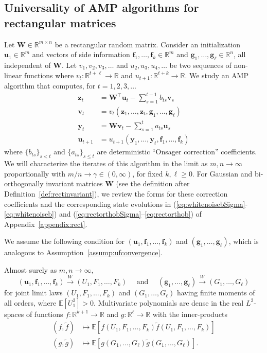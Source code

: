 \documentclass[10pt,reqno]{amsart}
\def\u{\mathbf{u}}
\def\v{\mathbf{v}}
\def\y{\mathbf{y}}
\def\z{\mathbf{z}}
\def\f{\mathbf{f}}
\def\g{\mathbf{g}}
\def\W{\mathbf{W}}
\def\E{\mathbb{E}}
\def\R{\mathbb{R}}
\def\toW{\overset{W}{\to}}
\def\bW{{\mathbf{W}}}
\begin{document}
\subsection{Universality of AMP algorithms for rectangular matrices}\label{sec:result_rec}

Let $\W \in \R^{m \times n}$ be a rectangular random matrix. Consider an
initialization $\u_1 \in \R^m$ and vectors of
side information $\f_1,\ldots,\f_k \in \R^m$ and $\g_1,\ldots,\g_\ell \in \R^n$,
all independent of $\W$. Let $v_1,v_2,v_3,\ldots$ and $u_2,u_3,u_4,\ldots$ be two sequences
of non-linear functions where $v_t:\R^{t+\ell} \to \R$ and
$u_{t+1}:\R^{t+k} \to \R$. We study an AMP algorithm that
computes, for $t=1,2,3,\ldots$
\begin{subequations}\label{eq:AMPrect}
\begin{align}
\z_t&=\W^\top \u_t-\sum_{s=1}^{t-1} b_{ts}\v_s \label{eq:AMPrectz}\\
\v_t&=v_t(\z_1,\ldots,\z_t,\g_1,\ldots,\g_\ell)\\
\y_t&=\W\v_t-\sum_{s=1}^t a_{ts} \u_s\\
\u_{t+1}&=u_{t+1}(\y_1,\ldots,\y_t,\f_1,\ldots,\f_k)\label{eq:AMPrectu}
\end{align}
\end{subequations}
where $\{b_{ts}\}_{s<t}$ and $\{a_{ts}\}_{s \leq t}$ are deterministic ``Onsager
correction'' coefficients. We will characterize the iterates of this algorithm
in the limit as $m,n \to \infty$ proportionally with
$m/n \to \gamma \in (0,\infty)$, for fixed $k,\ell \geq 0$. 
For Gaussian
and bi-orthogonally invariant matrices $\bW$ (see the definition after 
Definition~\ref{def:rectinvariant}), we review
the forms for these correction coefficients and the corresponding state
evolutions in 
(\ref{eq:whitenoisebSigma}-\ref{eq:whitenoiseb})
and (\ref{eq:rectorthobSigma}--\ref{eq:rectorthob}) of
Appendix~\ref{appendix:rect}.

We assume the following condition for $(\u_1,\f_1,\ldots,\f_k)$ and
$(\g_1,\ldots,\g_\ell)$, which is
analogous to Assumption~\ref{assump:ufconvergence}.

\begin{assumption}\label{assump:ufgconvergence}
Almost surely as $m,n \to \infty$,
\[(\u_1,\f_1,\ldots,\f_k) \toW (U_1,F_1,\ldots,F_k) \quad
\text{ and } \quad (\g_1,\ldots,\g_\ell) \toW (G_1,\ldots,G_\ell)\]
for joint limit laws $(U_1,F_1,\ldots,F_k)$ and $(G_1,\ldots,G_\ell)$ having
finite moments of all orders, where $\E[U_1^2]>0$. Multivariate polynomials
are dense in the real $L^2$-spaces of functions $f:\R^{k+1} \to \R$
and $g:\R^{\ell} \to \R$ with the inner-products
\begin{align*}
(f,\tilde f) &\mapsto \E[f(U_1,F_1,\ldots,F_k)\tilde f(U_1,F_1,\ldots,F_k)]\\
(g,\tilde g) &\mapsto 
\E[g(G_1,\ldots,G_\ell)\tilde g(G_1,\ldots,G_\ell)].
\end{align*}
\end{assumption}
\end{document}
